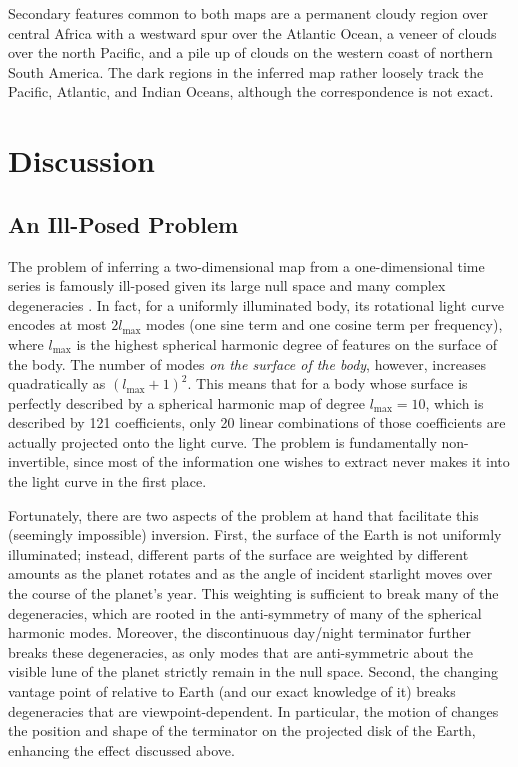\documentclass[modern]{aastex62}
\begin{document}
Secondary features common to both maps are a permanent cloudy region over
central Africa with a westward spur over the Atlantic Ocean, a veneer of clouds
over the north Pacific, and a pile up of clouds on the western coast of
northern South America. The dark regions in the inferred map rather loosely
track the Pacific, Atlantic, and Indian Oceans, although the correspondence
is not exact.

\section{Discussion}
\label{sec:discussion}

\subsection{An Ill-Posed Problem}
\label{sec:illposed}

The problem of inferring a two-dimensional map from a one-dimensional
time series is famously ill-posed given its large null space and many complex
degeneracies \citep[e.g.,][]{CowanFuentesHaggard2013}. In fact, for a 
uniformly illuminated body, its rotational light curve encodes at most
$2l_\mathrm{max}$ modes (one sine term and one cosine term per frequency), 
where $l_\mathrm{max}$ is the highest spherical
harmonic degree of features on the surface of the body. The number of modes
\emph{on the surface of the body}, however, increases quadratically 
as $(l_\mathrm{max} + 1)^2$. This means that for a body whose surface is
perfectly described by a spherical harmonic map of degree $l_\mathrm{max} = 10$,
which is described by 121 coefficients, only 20 linear combinations
of those coefficients are actually projected onto the light curve. The
problem is fundamentally non-invertible, since most of the information
one wishes to extract never makes it into the light curve in the first place.

Fortunately, there are two aspects of the problem at hand that facilitate
this (seemingly impossible) inversion. First, the surface of the Earth is
not uniformly illuminated; instead, different parts of the surface are weighted
by different amounts as the planet rotates and as the angle of incident starlight
moves over the course of the planet's year. This weighting is sufficient to break many
of the degeneracies, which are rooted in the anti-symmetry of many of the spherical
harmonic modes. Moreover, the discontinuous day/night terminator further
breaks these degeneracies, as only modes that are anti-symmetric about
the visible lune of the planet strictly remain in the null space. Second, 
the changing vantage point of \TESS relative to Earth (and our exact knowledge of it)
breaks degeneracies that are viewpoint-dependent. In particular, the motion of
\TESS changes the position and shape of the terminator on the projected disk
of the Earth, enhancing the effect discussed above.
\end{document}
